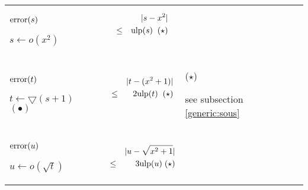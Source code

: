 \documentclass[12pt]{amsart}
\def\minf{\bigtriangledown}
\def\ulp{{\rm ulp}}
\begin{document}
\begin{center}
\begin{tabular}{l l l}

\begin{minipage}{2.5cm}
${\textnormal{error}}(s)$


$s \leftarrow o(x^2) $

\end{minipage} &
\begin{minipage}{7.5cm}

\begin{eqnarray}\nonumber
  &&|s-x^2| \\\nonumber
  &       \leq&  \ulp(s)\;\;(\star)\\\nonumber
\end{eqnarray}


\end{minipage} &
\begin{minipage}{6cm}

\end{minipage}\\%
\begin{minipage}{2.5cm}
${\textnormal{error}}(t)$


$t \leftarrow \minf(s+1) $
$(\bullet)$
\end{minipage} &
\begin{minipage}{7.5cm}



\begin{eqnarray}\nonumber
  &&|t-(x^2+1)| \\\nonumber
  &       \leq&  2 \ulp(t) \;\;(\star)\\\nonumber
\end{eqnarray}


\end{minipage} &
\begin{minipage}{6cm}

($\star$)

see subsection \ref{generic:sous}


\end{minipage}\\%
\begin{minipage}{2.5cm}
${\textnormal{error}}(u)$


$u \leftarrow o(\sqrt{t}) $


\end{minipage} &
\begin{minipage}{7.5cm}

\begin{eqnarray}\nonumber
  &&|u-\sqrt{x^2+1}| \\\nonumber
  &       \leq& 3 \ulp(u) \;(\star)
\end{eqnarray}



\end{minipage}
\end{tabular}
\end{center}
\end{document}
